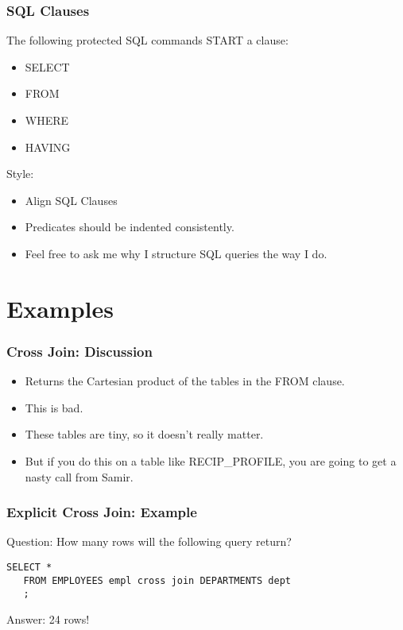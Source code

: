 \documentclass{beamer}
\begin{document}
\begin{frame}
  \frametitle{SQL Clauses}
  The following protected SQL commands START a clause:
  \smallskip
  \begin{itemize}
  \item SELECT
  \item FROM
  \item WHERE
  \item HAVING
  \end{itemize}

  \bigskip
  \pause
  Style:
  \smallskip
  \begin{itemize}
  \item Align SQL Clauses
  \item Predicates should be indented consistently.
  \item Feel free to ask me why I structure SQL queries the way I do.
  \end{itemize}
  
\end{frame}

\section{Examples} %

\begin{frame}
  \frametitle{Cross Join: Discussion}
  \begin{itemize}
  \item Returns the Cartesian product of the tables in the FROM
    clause. 
  \item This is bad.
  \item These tables are tiny, so it doesn't really matter.
  \item But if you do this on a table like RECIP\_PROFILE, you are
    going to get a nasty call from Samir.
  \end{itemize}
\end{frame}

\begin{frame}[fragile]
  \frametitle{Explicit Cross Join: Example}

  Question: How many rows will the following query return?
  \bigskip

  \begin{lstlisting}[title={\tiny Source: https://github.com/Choens/sql-survival-guide/blob/master/sql/04-joins/cross-joins.sql}]
   SELECT *
   FROM EMPLOYEES empl cross join DEPARTMENTS dept
   ; 
  \end{lstlisting}
  
  \bigskip
  \pause 
  Answer: 24 rows!
  
\end{frame}
\end{document}
